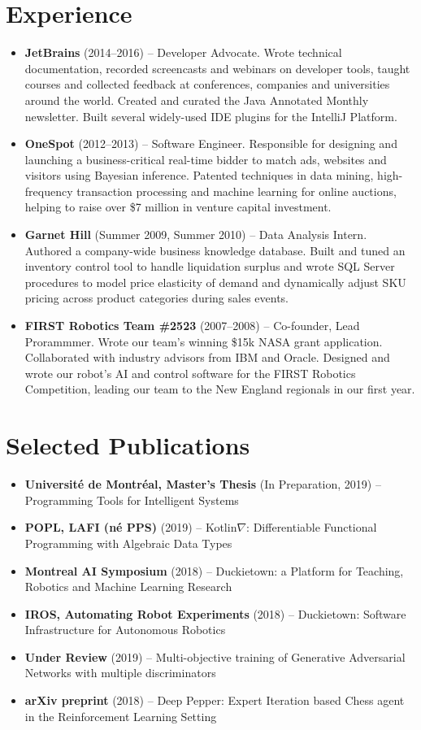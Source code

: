 \documentclass[letterpaper,11pt]{article}
\newcommand{\resumeItem}[2]{
\item\small{
\textbf{#1}{ #2 \vspace{-2pt}}
}
}
\newcommand{\resumeSubItem}[2]{\resumeItem{#1}{#2}\vspace{-4pt}}
\newcommand{\resumeSubHeadingListStart}{\begin{itemize}[leftmargin=*]}
\newcommand{\resumeSubHeadingListEnd}{\end{itemize}}
\begin{document}
\begin{justify}
\section{Experience}
\resumeSubHeadingListStart
\resumeSubItem{JetBrains}{(2014--2016) -- Developer Advocate. Wrote technical documentation, recorded screencasts and webinars on developer tools, taught courses and collected feedback at conferences, companies and universities around the world. Created and curated the Java Annotated Monthly newsletter. Built several widely-used IDE plugins for the IntelliJ Platform.}
\resumeSubItem{OneSpot}{(2012--2013) -- Software Engineer. Responsible for designing and launching a business-critical real-time bidder to match ads, websites and visitors using Bayesian inference. Patented techniques in data mining, high-frequency transaction processing and machine learning for online auctions, helping to raise over \$7 million in venture capital investment.}
\resumeSubItem{Garnet Hill}{(Summer 2009, Summer 2010) -- Data Analysis Intern. Authored a company-wide business knowledge database. Built and tuned an inventory control tool to handle liquidation surplus and wrote SQL Server procedures to model price elasticity of demand and dynamically adjust SKU pricing across product categories during sales events.}
\resumeSubItem{FIRST Robotics Team \#2523}{(2007--2008) -- Co-founder, Lead Prorammmer. Wrote our team's winning \$15k NASA grant application. Collaborated with industry advisors from IBM and Oracle. Designed and wrote our robot's AI and control software for the FIRST Robotics Competition, leading our team to the New England regionals in our first year.}
\resumeSubHeadingListEnd


\section{Selected Publications}
\resumeSubHeadingListStart
\resumeSubItem{Universit\'e de Montr\'eal, Master's Thesis} {(In Preparation, 2019) -- Programming Tools for Intelligent Systems}
\resumeSubItem{POPL, LAFI (n\'e PPS)} {(2019) -- Kotlin$\nabla$: Differentiable Functional Programming with Algebraic Data Types}
\resumeSubItem{Montreal AI Symposium} {(2018) -- Duckietown: a Platform for Teaching, Robotics and Machine Learning Research}
\resumeSubItem{IROS, Automating Robot Experiments} {(2018) -- Duckietown: Software Infrastructure for Autonomous Robotics}
\resumeSubItem{Under Review} {(2019) -- Multi-objective training of Generative Adversarial Networks with multiple discriminators}
\resumeSubItem{arXiv preprint} {(2018) -- Deep Pepper: Expert Iteration based Chess agent in the Reinforcement Learning Setting}
\resumeSubHeadingListEnd


\end{justify}
\end{document}
